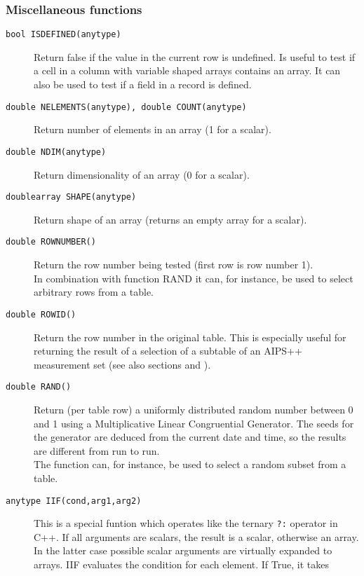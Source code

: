 \subsubsection{Miscellaneous functions}
\begin{description}
  \item[ \texttt{bool ISDEFINED(anytype)}]
    Return false if the value in the current row is undefined. Is
    useful to test if a cell in a column with variable shaped arrays
    contains an array. It can also be used to test if a field in a
    record is defined.
  \item[ \texttt{double NELEMENTS(anytype), double COUNT(anytype)}]
    Return number of elements in an array (1 for a scalar).
  \item[ \texttt{double NDIM(anytype)}]
    Return dimensionality of an array (0 for a scalar).
  \item[ \texttt{doublearray SHAPE(anytype)}]
    Return shape of an array (returns an empty array for a scalar).
  \item[ \texttt{double ROWNUMBER()}]
       Return the row number being tested (first row is row number 1).
       \\In combination with function RAND it can, for instance,
       be used to select arbitrary rows from a table.
  \item[ \texttt{double ROWID()}]
       Return the row number in the original table. This is especially
       useful for returning the result of a selection of a subtable
       of an AIPS++ measurement set
       (see also sections 
       and ).
  \item[ \texttt{double RAND()}]
       Return (per table row) a uniformly distributed random number
       between 0 and 1 using a Multiplicative Linear Congruential Generator.
       The seeds for the generator are deduced from the current date and
       time, so the results are different from run to run.
       \\The function can, for instance, be used to select a random
       subset from a table.
  \item[ \texttt{anytype IIF(cond,arg1,arg2)}]
       This is a special funtion which operates like the ternary \texttt{?:}
       operator in C++. 
       If all arguments are scalars, the result is a scalar, otherwise
       an array. In the latter case possible scalar arguments are
       virtually expanded to arrays.
       IIF evaluates the condition for each element. If True, it takes

\end{description}

